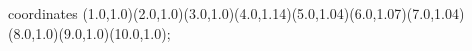 					coordinates { (1.0,1.0)(2.0,1.0)(3.0,1.0)(4.0,1.14)(5.0,1.04)(6.0,1.07)(7.0,1.04)(8.0,1.0)(9.0,1.0)(10.0,1.0)};